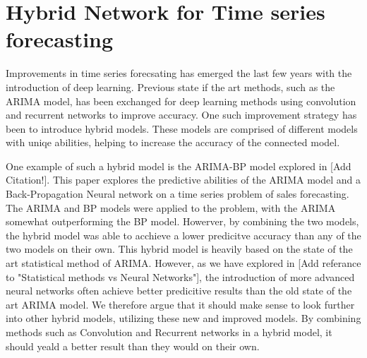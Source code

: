 
\section{Hybrid Network for Time series forecasting}
\label{section:RelatedWork:Hybrid}



Improvements in time series forecsating has emerged the last few years with the introduction of deep learning.
Previous state if the art methods, such as the ARIMA model, has been exchanged for deep learning methods using convolution and recurrent networks to improve accuracy.
One such improvement strategy has been to introduce hybrid models.
These models are comprised of different models with uniqe abilities, helping to increase the accuracy of the connected model.


One example of such a hybrid model is the ARIMA-BP model explored in [Add Citation!].
This paper explores the predictive abilities of the ARIMA model and a Back-Propagation Neural network on a time series problem of sales forecasting.
The ARIMA and BP models were applied to the problem, with the ARIMA somewhat outperforming the BP model.
Howerver, by combining the two models, the hybrid model was able to acchieve a lower predicitve accuracy than any of the two models on their own.
This hybrid model is heavily based on the state of the art statistical method of ARIMA.
However, as we have explored in [Add referance to "Statistical methods vs Neural Networks"], the introduction of more advanced neural networks often achieve better predicitive results than the old state of the art ARIMA model.
We therefore argue that it should make sense to look further into other hybrid models, utilizing these new and improved models.
By combining methods such as Convolution and Recurrent networks in a hybrid model, it should yeald a better result than they would on their own.



